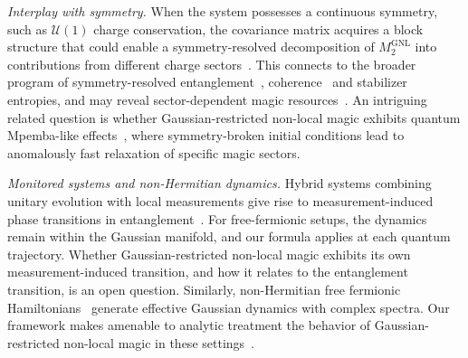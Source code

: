 \documentclass[prx,twocolumn,superscriptaddress,aps,10pt, frontmatterverbose, reprint,footinbib,longbibliography=true]{revtex4-2}
\begin{document}
\emph{Interplay with symmetry.}
When the system possesses a continuous symmetry, such as $\mathcal{U}(1)$ charge conservation, the covariance matrix acquires a block structure that could enable a symmetry-resolved decomposition of $M_2^{\mathrm{GNL}}$ into contributions from different charge sectors~\cite{Goldstein}.
This connects to the broader program of symmetry-resolved entanglement~\cite{Bianchi_2022}, coherence~\cite{aditya2026coherencedynamicsquantummanybody} and stabilizer entropies, and may reveal sector-dependent magic resources~\cite{iannotti2026nonstabilizernessu1symmetrychaotic, cepollaro2025stabilizerentropysubspaces, Esposito_2024}.
An intriguing related question is whether Gaussian-restricted non-local magic exhibits quantum Mpemba-like effects~\cite{Ares_2023,Ares_2025,aditya2025mpembaeffectsquantumcomplexity}, where symmetry-broken initial conditions lead to anomalously fast relaxation of specific magic sectors.

\emph{Monitored systems and non-Hermitian dynamics.}
Hybrid systems combining unitary evolution with local measurements give rise to measurement-induced phase transitions in entanglement~\cite{FisherRandom2023,Li_2025,oshima}.
For free-fermionic setups, the dynamics remain within the Gaussian manifold, and our formula applies at each quantum trajectory.
Whether Gaussian-restricted non-local magic exhibits its own measurement-induced transition, and how it relates to the entanglement transition, is an open question.
Similarly, non-Hermitian free fermionic Hamiltonians~\cite{Ashida_2020,kawabata2026nonhermitiandisorderedsystems} generate effective Gaussian dynamics with complex spectra.
Our framework makes amenable to analytic treatment the behavior of Gaussian-restricted non-local magic in these settings~\cite{schirooooo,gallo,granet,lapierre2025entanglementtransitionsstructuredrandom}.
\end{document}
